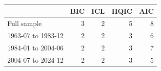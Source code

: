 \begin{tabular}{lrrrr}
\toprule
 & BIC & ICL & HQIC & AIC \\
\midrule
Full sample & 3 & 2 & 5 & 8 \\
1963-07 to 1983-12 & 2 & 2 & 3 & 6 \\
1984-01 to 2004-06 & 2 & 2 & 3 & 7 \\
2004-07 to 2024-12 & 2 & 2 & 3 & 5 \\
\bottomrule
\end{tabular}

